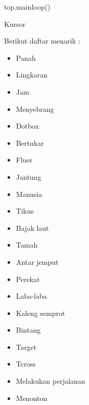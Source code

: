 \documentclass[a4paper,12pt]{report}
\begin{document}
\begin{myEnumerate}
{\fontsize{10pt}{10pt}\selectfont top.mainloop()} \par
\noindent 
\item Kursor \par
\noindent 
Berikut daftar menarik : \par
\noindent 
\begin{itemize}
\item Panah \par
\noindent 
\item Lingkaran \par
\noindent 
\item Jam \par
\noindent 
\item Menyebrang \par
\noindent 
\item Dotbox \par
\noindent 
\item Bertukar \par
\noindent 
\item Fluer \par
\noindent 
\item Jantung \par
\noindent 
\item Manusia \par
\noindent 
\item Tikus \par
\noindent 
\item Bajak laut \par
\noindent 
\item Tamah \par
\noindent 
\item Antar jemput \par
\noindent 
\item Perekat \par
\noindent 
\item Laba-laba \par
\noindent 
\item Kaleng semprot \par
\noindent 
\item Bintang \par
\noindent 
\item Target \par
\noindent 
\item Tcross \par
\noindent 
\item Melakukan perjalanan \par
\noindent 
\item Menonton\end{itemize}

\end{myEnumerate}
\end{document}
